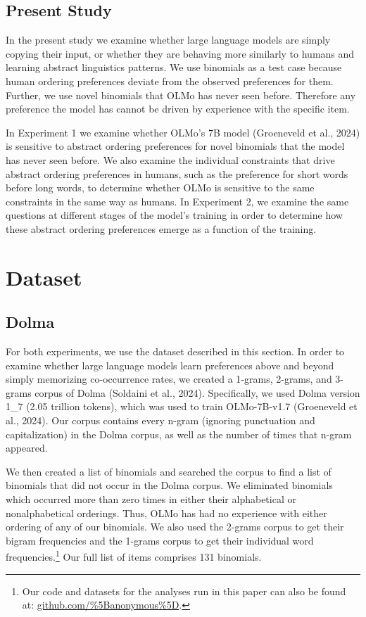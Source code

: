 \documentclass[
  10pt,
  nohyperref]{acl}
\begin{document}
\subsection{Present Study}\label{present-study}

In the present study we examine whether large language models are simply
copying their input, or whether they are behaving more similarly to
humans and learning abstract linguistics patterns. We use binomials as a
test case because human ordering preferences deviate from the observed
preferences for them. Further, we use novel binomials that OLMo has
never seen before. Therefore any preference the model has cannot be
driven by experience with the specific item.

In Experiment 1 we examine whether OLMo's 7B model (Groeneveld et al.,
2024) is sensitive to abstract ordering preferences for novel binomials
that the model has never seen before. We also examine the individual
constraints that drive abstract ordering preferences in humans, such as
the preference for short words before long words, to determine whether
OLMo is sensitive to the same constraints in the same way as humans. In
Experiment 2, we examine the same questions at different stages of the
model's training in order to determine how these abstract ordering
preferences emerge as a function of the training.

\section{Dataset}\label{dataset}

\subsection{Dolma}\label{dolma}

For both experiments, we use the dataset described in this section. In
order to examine whether large language models learn preferences above
and beyond simply memorizing co-occurrence rates, we created a 1-grams,
2-grams, and 3-grams corpus of Dolma (Soldaini et al., 2024).
Specifically, we used Dolma version 1\_7 (2.05 trillion tokens), which
was used to train OLMo-7B-v1.7 (Groeneveld et al., 2024). Our corpus
contains every n-gram (ignoring punctuation and capitalization) in the
Dolma corpus, as well as the number of times that n-gram appeared.

We then created a list of binomials and searched the corpus to find a
list of binomials that did not occur in the Dolma corpus. We eliminated
binomials which occurred more than zero times in either their
alphabetical or nonalphabetical orderings. Thus, OLMo has had no
experience with either ordering of any of our binomials. We also used
the 2-grams corpus to get their bigram frequencies and the 1-grams
corpus to get their individual word frequencies.\footnote{Our code and
  datasets for the analyses run in this paper can also be found at:
  \url{github.com/\%5Banonymous\%5D}.} Our full list of items comprises
131 binomials.
\end{document}
